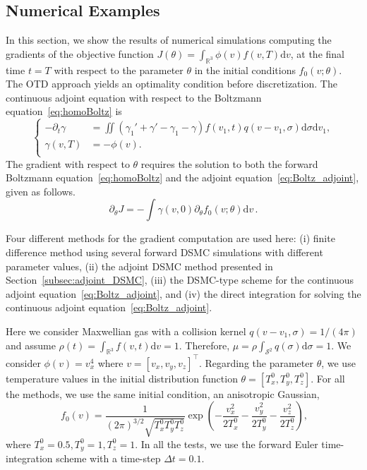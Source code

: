 \documentclass[12pt]{amsart}
\newcommand{\bbR}{\mathbb R} \newcommand{\bbS}{\mathbb S}
\newcommand{\cS}{\mathcal S} \newcommand{\cT}{\mathcal T}
\newcommand{\Stwo}{{\cS^2}}
\newcommand{\rd}{\mathrm{d}}
\begin{document}
\subsection{Numerical Examples}
In this section,   we show the results of numerical simulations computing the gradients of the objective function $ J(\theta) = \int_{\bbR^3} \phi(v) f(v, T) \rd v$, at the final time $t=T$ with respect to the parameter $\theta$ in the initial conditions $f_0(v;\theta)$.   The OTD approach yields an optimality condition before discretization. The continuous adjoint equation with respect to the Boltzmann equation~\eqref{eq:homoBoltz}  is 
\begin{equation}\label{eq:Boltz_adjoint}
  \left\{\begin{array}{rl}
- \partial_t  \gamma  &= \iint (  \gamma_1' + \gamma' - \gamma_1 - \gamma)   f(v_1,t)   q(v-v_1,\sigma)  \rd \sigma \rd v_1,\\
\gamma(v,T) &= - \phi(v). \\
\end{array}\right.
\end{equation} 
The gradient with respect to $\theta$ requires the solution to both the forward Boltzmann equation~\eqref{eq:homoBoltz} and the adjoint equation~\eqref{eq:Boltz_adjoint}, given as follows. 
\begin{equation}\label{eq:Bolz_OTD_grad}
\partial_\theta J = -\int\gamma(v,0) \partial_\theta f_0(v;\theta) \rd v\,.
\end{equation}


Four different methods for the gradient computation are used here: (i) finite difference method using several forward DSMC simulations with different parameter values, (ii) the adjoint DSMC method presented in Section~\ref{subsec:adjoint_DSMC},  (iii) the DSMC-type scheme for the continuous adjoint equation~\eqref{eq:Boltz_adjoint},  and (iv) the direct integration for solving the continuous adjoint equation~\eqref{eq:Boltz_adjoint}.  

Here we consider Maxwellian gas with a collision kernel $q(v-v_1,\sigma) =1/(4\pi)$ and assume $\rho(t)=\int_{\bbR^3} f(v,t) \rd v=1$.   Therefore,  $\mu =\rho \int_\Stwo q(\sigma)\rd \sigma = 1$.   We consider  $\phi(v)  = v_x^4$ where $v = [v_x, v_y, v_z]^\top$.   Regarding the parameter $\theta$,  we use temperature values in the initial distribution function $\theta=[T_x^0, T_y^0, T_z^0]$.   For all the methods,  we use the same initial condition,   an anisotropic Gaussian, 
\begin{equation*}~\label{eq:IC}
f_0(v) = \frac{1}{(2\pi)^{3/2}\sqrt{T_x^0 T_y^0 T_z^0}} \exp\left(-\frac{v_x^2}{2T_x^0}-\frac{v_y^2}{2T_y^0}-\frac{v_z^2}{2T_z^0}\right),
\end{equation*}
where $T_x^0=0.5,T_y^0=1,T_z^0=1$.  In all the tests, we use the forward Euler time-integration scheme with a time-step $\Delta t=0.1$.  
\end{document}
